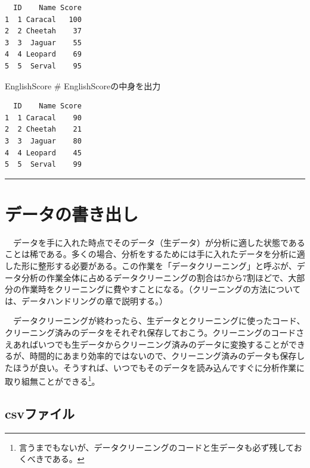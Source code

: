 \documentclass[
  a4paper,
  pandoc,
  ja=standard,
  jafont=haranoaji]{bxjsbook}
\newenvironment{Shaded}{\begin{snugshade}}{\end{snugshade}}
\newcommand{\CommentTok}[1]{\textcolor[rgb]{0.37,0.37,0.37}{#1}}
\newcommand{\NormalTok}[1]{\textcolor[rgb]{0.00,0.48,0.65}{#1}}
\begin{document}
\begin{verbatim}
  ID    Name Score
1  1 Caracal   100
2  2 Cheetah    37
3  3  Jaguar    55
4  4 Leopard    69
5  5  Serval    95
\end{verbatim}

\begin{Shaded}
\begin{Highlighting}[numbers=left,,]
\NormalTok{EnglishScore }\CommentTok{\# EnglishScoreの中身を出力}
\end{Highlighting}
\end{Shaded}

\begin{verbatim}
  ID    Name Score
1  1 Caracal    90
2  2 Cheetah    21
3  3  Jaguar    80
4  4 Leopard    45
5  5  Serval    99
\end{verbatim}

\begin{center}\rule{0.5\linewidth}{0.5pt}\end{center}

\hypertarget{sec-io_export}{%
\section{データの書き出し}\label{sec-io_export}}

　データを手に入れた時点でそのデータ（生データ）が分析に適した状態であることは稀である。多くの場合、分析をするためには手に入れたデータを分析に適した形に整形する必要がある。この作業を「データクリーニング」と呼ぶが、データ分析の作業全体に占めるデータクリーニングの割合は5から7割ほどで、大部分の作業時をクリーニングに費やすことになる。（クリーニングの方法については、データハンドリングの章で説明する。）

　データクリーニングが終わったら、生データとクリーニングに使ったコード、クリーニング済みのデータをそれぞれ保存しておこう。クリーニングのコードさえあればいつでも生データからクリーニング済みのデータに変換することができるが、時間的にあまり効率的ではないので、クリーニング済みのデータも保存したほうが良い。そうすれば、いつでもそのデータを読み込んですぐに分析作業に取り組無ことができる\footnote{言うまでもないが、データクリーニングのコードと生データも必ず残しておくべきである。}。

\hypertarget{csvux30d5ux30a1ux30a4ux30eb}{%
\subsection{csvファイル}\label{csvux30d5ux30a1ux30a4ux30eb}}
\end{document}
